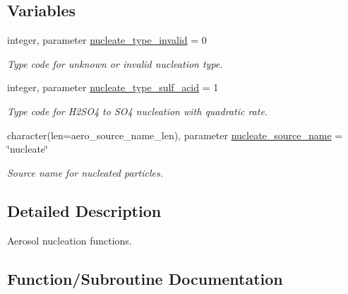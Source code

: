 \subsection*{Variables}
\begin{DoxyCompactItemize}
\item 
integer, parameter \mbox{\hyperlink{namespacepmc__nucleate_a9b3294f7b14e77755d00cdf9083befe5}{nucleate\+\_\+type\+\_\+invalid}} = 0
\begin{DoxyCompactList}\small\item\em Type code for unknown or invalid nucleation type. \end{DoxyCompactList}\item 
integer, parameter \mbox{\hyperlink{namespacepmc__nucleate_a0bc83e4138421dbce4f88810145e181b}{nucleate\+\_\+type\+\_\+sulf\+\_\+acid}} = 1
\begin{DoxyCompactList}\small\item\em Type code for H2\+S\+O4 to S\+O4 nucleation with quadratic rate. \end{DoxyCompactList}\item 
character(len=aero\+\_\+source\+\_\+name\+\_\+len), parameter \mbox{\hyperlink{namespacepmc__nucleate_ac08d8268c41b7f65623b08b460233e9c}{nucleate\+\_\+source\+\_\+name}} = \char`\"{}nucleate\char`\"{}
\begin{DoxyCompactList}\small\item\em Source name for nucleated particles. \end{DoxyCompactList}\end{DoxyCompactItemize}


\subsection{Detailed Description}
Aerosol nucleation functions. 

\subsection{Function/\+Subroutine Documentation}
\mbox{\label{namespacepmc__nucleate_ab7689a91cea62cc200e2356b2c201416}} 
